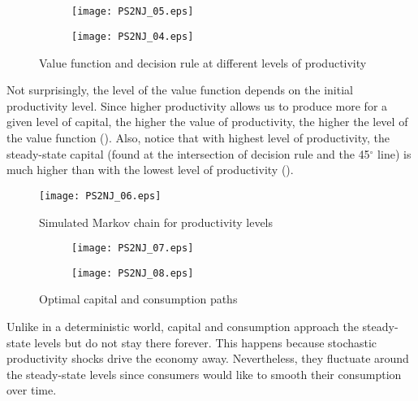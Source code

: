 \documentclass[]{article}
\begin{document}
\subsection{}

\begin{figure}[h]
	\centering
	\begin{subfigure}{0.5\textwidth}
		\centering
		\texttt{[image: PS2NJ\_05.eps]}
		\caption{}
		\label{fig:2.2a}
	\end{subfigure}%
	\begin{subfigure}{0.5\textwidth}
		\centering
		\texttt{[image: PS2NJ\_04.eps]}
		\caption{}
		\label{fig:2.2b}
	\end{subfigure}
	\caption{Value function and decision rule at different levels of productivity}
\end{figure}

Not surprisingly, the level of the value function depends on the initial productivity level. Since higher productivity allows us to produce more for a given level of capital, the higher the value of productivity, the higher the level of the value function (). Also, notice that with highest level of productivity, the steady-state capital (found at the intersection of decision rule and the 45$^\circ$ line) is much higher than with the lowest level of productivity ().

\begin{figure}[h]
	\centering
	\texttt{[image: PS2NJ\_06.eps]}
	\caption{Simulated Markov chain for productivity levels}
	\label{fig:2.2c}
\end{figure}

\begin{figure}[h]
	\centering
	\begin{subfigure}{0.5\textwidth}
		\centering
		\texttt{[image: PS2NJ\_07.eps]}
		\caption{}
		\label{fig:2.2d}
	\end{subfigure}%
	\begin{subfigure}{0.5\textwidth}
		\centering
		\texttt{[image: PS2NJ\_08.eps]}
		\caption{}
		\label{fig:2.2e}
	\end{subfigure}
	\caption{Optimal capital and consumption paths}
\end{figure}

Unlike in a deterministic world, capital and consumption approach the steady-state levels but do not stay there forever. This happens because stochastic productivity shocks drive the economy away. Nevertheless, they fluctuate around the steady-state levels since consumers would like to smooth their consumption over time.
\end{document}

